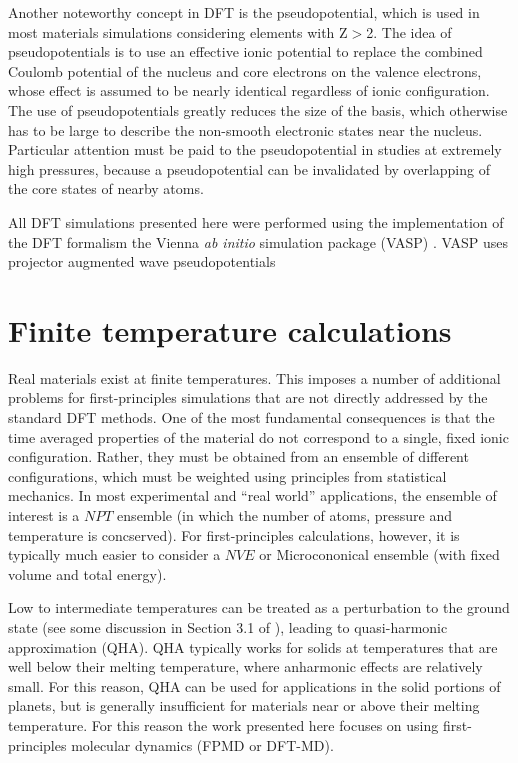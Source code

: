 Another noteworthy concept in DFT is the pseudopotential, which is  used in most
materials simulations considering elements with Z$>$2. The idea of pseudopotentials
is to use an effective ionic potential to replace the combined Coulomb potential of
the nucleus and core electrons on the valence electrons, whose effect is assumed to be
nearly identical regardless of ionic configuration. The use of pseudopotentials
greatly reduces the size of the basis, which otherwise has to be large to describe
the non-smooth electronic states near the nucleus. Particular attention must  be
paid to the pseudopotential in studies at extremely high pressures, because a
pseudopotential can be invalidated by overlapping of the core states of nearby atoms.


All DFT simulations presented here were performed using the implementation of the DFT
formalism the Vienna {\it ab initio} simulation package (VASP) \citep{Kresse1996}.
VASP uses projector augmented wave pseudopotentials \citep{Blochl1994} 

\section{Finite temperature calculations}

Real materials exist at finite temperatures. This imposes a number of additional
problems for first-principles simulations that are not directly addressed by the 
standard DFT methods. One of the most fundamental consequences is that the time
averaged properties of the material do not correspond to a single, fixed ionic
configuration. Rather, they must be obtained from an ensemble of different
configurations, which must be weighted using principles from statistical mechanics.
In most experimental and ``real world'' applications, the ensemble of interest is a
$NPT$ ensemble (in which the number of atoms, pressure and temperature is concserved). For
first-principles calculations, however, it is typically much easier to consider a
$NVE$ or Microcononical ensemble (with fixed volume and total energy).

Low to intermediate temperatures can be treated as a perturbation to the ground state
(see some discussion in Section 3.1 of \cite{martin-esbook}), leading to
quasi-harmonic approximation (QHA). QHA typically works for solids at temperatures
that are well below their melting temperature, where anharmonic effects are relatively
small. For this reason, QHA can be used for applications in the solid portions of
planets, but is generally insufficient for materials near or above their melting
temperature. For this reason the work presented here focuses on using
first-principles molecular dynamics (FPMD or DFT-MD).

